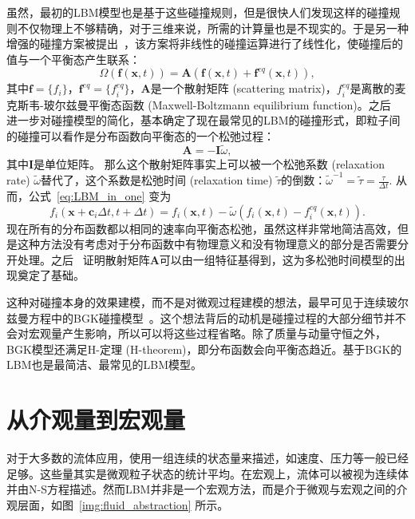 虽然，最初的LBM模型也是基于这些碰撞规则，但是很快人们发现这样的碰撞规则不仅物理上不够精确，对于三维来说，所需的计算量也是不现实的。于是另一种增强的碰撞方案被提出~\citep{higuera1989lattice, higuera1989boltzmann}，该方案将非线性的碰撞运算进行了线性化，使碰撞后的值与一个平衡态产生联系：
\begin{equation}
    \Omega(\mathbf{f}(\mathbf{x},t))=\mathbf{A}(\mathbf{f}(\mathbf{x},t)+\mathbf{f}^{eq}(\mathbf{x},t)),
\end{equation}
其中$\mathbf{f}=\{f_i\}$，$\mathbf{f}^{eq}=\{f_{i}^{eq}\}$，$\mathbf{A}$是一个散射矩阵 (scattering matrix)，$f_{i}^{eq}$是离散的麦克斯韦-玻尔兹曼平衡态函数 (Maxwell-Boltzmann equilibrium function)。之后~\citet{qian1992lattice} 进一步对碰撞模型的简化，基本确定了现在最常见的LBM的碰撞形式，即粒子间的碰撞可以看作是分布函数向平衡态的一个松弛过程：
\begin{equation}
    \mathbf{A}=-\mathbf{I}\tilde{\omega},
\end{equation}
其中$\mathbf{I}$是单位矩阵。
那么这个散射矩阵事实上可以被一个松弛系数 (relaxation rate) $\tilde{\omega}$替代了，这个系数是松弛时间 (relaxation time) $\tilde{\tau}$的倒数：$\tilde{\omega}^{-1}=\tilde{\tau}=\frac{\tau}{\Delta t}$. 从而，公式~\ref{eq:LBM_in_one} 变为
\begin{equation}
    f_{i}(\mathbf{x}+\mathbf{c}_i \Delta t,t+\Delta t)=f_{i}(\mathbf{x},t)-\tilde{\omega}(f_{i}(\mathbf{x},t)-f_{i}^{eq}(\mathbf{x},t)).
    \label{eq:LBM_in_one_BGK}
\end{equation}
现在所有的分布函数都以相同的速率向平衡态松弛，虽然这样非常地简洁高效，但是这种方法没有考虑对于分布函数中有物理意义和没有物理意义的部分是否需要分开处理。之后~\citet{d1992generalized} 证明散射矩阵$\mathbf{A}$可以由一组特征基得到，这为多松弛时间模型的出现奠定了基础。

这种对碰撞本身的效果建模，而不是对微观过程建模的想法，最早可见于连续玻尔兹曼方程中的BGK碰撞模型~\citep{Bhatnagar-1954}。这个想法背后的动机是碰撞过程的大部分细节并不会对宏观量产生影响，所以可以将这些过程省略。除了质量与动量守恒之外，BGK模型还满足$\mathrm{H}$-定理 (H-theorem)，即分布函数会向平衡态趋近。基于BGK的LBM也是最简洁、最常见的LBM模型。


\section{从介观量到宏观量}
\label{sec:moment}
对于大多数的流体应用，使用一组连续的状态量来描述，如速度、压力等一般已经足够。这些量其实是微观粒子状态的统计平均。在宏观上，流体可以被视为连续体并由N-S方程描述。然而LBM并非是一个宏观方法，而是介于微观与宏观之间的介观层面，如图~\ref{img:fluid_abstraction} 所示。

